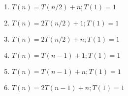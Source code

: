\documentclass [letterpaper,12pt]{article}
\begin{document}
\begin{enumerate}
\item $T(n)=T(n/2) + n; T(1)=1$ %
\item $T(n)=2T(n/2) + 1; T(1)=1$ %
\item $T(n)=2T(n/2) + n; T(1)=1$ %

\item $T(n)=T(n-1) + 1; T(1)=1$ %
\item $T(n)=T(n-1) + n; T(1)=1$ %
\item $T(n)=2T(n-1) + n; T(1)=1$ %
\end{enumerate}
\end{document}
